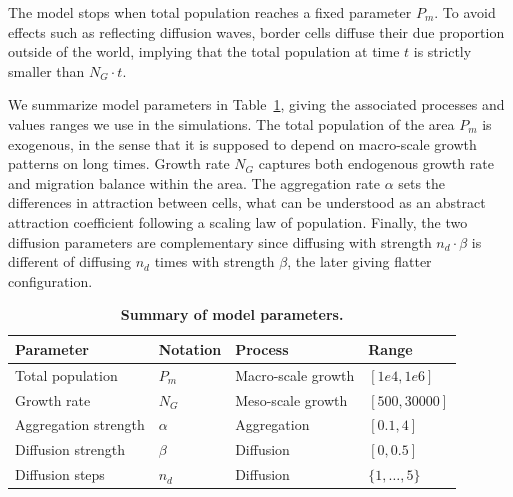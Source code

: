 \documentclass[10pt,letterpaper]{article}
\begin{document}
The model stops when total population reaches a fixed parameter $P_m$. To avoid  effects such as reflecting diffusion waves, border cells diffuse their due proportion outside of the world, implying that the total population at time $t$ is strictly smaller than $N_G\cdot t$.

We summarize model parameters in Table~\ref{tab:parameters}, giving the associated processes and values ranges we use in the simulations. The total population of the area $P_m$ is exogenous, in the sense that it is supposed to depend on macro-scale growth patterns on long times. Growth rate $N_G$ captures both endogenous growth rate and migration balance within the area. The aggregation rate $\alpha$ sets the differences in attraction between cells, what can be understood as an abstract attraction coefficient following a scaling law of population. Finally, the two diffusion parameters are complementary since diffusing with strength $n_d\cdot \beta$ is different of diffusing $n_d$ times with strength $\beta$, the later giving flatter configuration. 




\begin{table}[!ht]
\caption{{\bf Summary of model parameters.}}
\begin{tabular}{|l|l|l|l|}
\hline
Parameter & Notation & Process & Range\\ \hline
Total population & $P_m$ & Macro-scale growth & $[1e4,1e6]$\\ \hline
Growth rate & $N_G$ & Meso-scale growth  & $[500,30000]$\\ \hline
Aggregation strength & $\alpha$ & Aggregation & $[0.1,4]$\\ \hline
Diffusion strength & $\beta$ & Diffusion & $[0,0.5]$\\ \hline
Diffusion steps & $n_d$ & Diffusion & $\{1,\ldots , 5\}$\\ \hline
\end{tabular}
\label{tab:parameters}
\end{table}


\paragraph*{}
\end{document}
